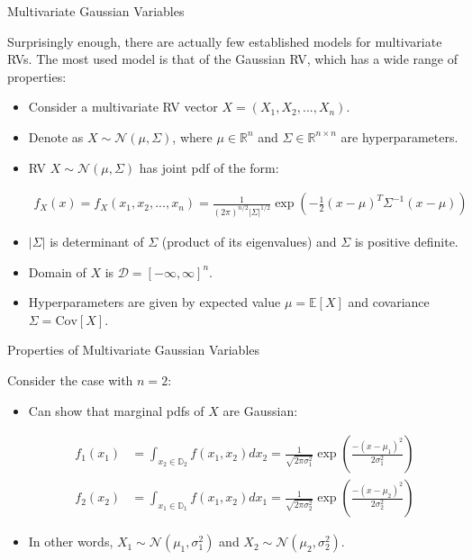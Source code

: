 \documentclass[9pt]{beamer}
\begin{document}
%
\begin{frame}{Multivariate Gaussian Variables}

Surprisingly enough, there are actually few established models for multivariate RVs.  The most used model is that of the Gaussian RV, which has a wide range of properties:

\begin{itemize}
\item Consider a multivariate RV vector $X=(X_1,X_2,...,X_n)$.

\item Denote as $X\sim \mathcal{N}(\mu,\Sigma)$, where $\mu\in \mathbb{R}^n$ and $\Sigma\in \mathbb{R}^{n\times n}$ are hyperparameters. 

\item RV $X\sim \mathcal{N}(\mu,\Sigma)$ has joint pdf of the form:
\begin{block}{}
\begin{align*}
f_X(x)=f_X(x_1,x_2,...,x_n)=\frac{1}{(2\pi)^{n/2}|\Sigma|^{1/2}}\exp\left(-\frac{1}{2}(x-\mu)^T\Sigma^{-1}(x-\mu)\right)
\end{align*}
\end{block}
\item $|\Sigma|$ is determinant of  $\Sigma$ (product of its eigenvalues) and $\Sigma$ is positive definite. 

\item Domain of $X$ is $\mathcal{D}=[-\infty,\infty]^n$. 

\item Hyperparameters are given by expected value $\mu=\mathbb{E}[X]$ and covariance $\Sigma=\textrm{Cov}[X]$.

\end{itemize}

\end{frame}

%
\begin{frame}{Properties of Multivariate Gaussian Variables}

Consider the case with $n=2$:
\begin{itemize}
\item Can show that marginal pdfs of $X$ are Gaussian:
\begin{block}{}
\begin{align*}
f_1(x_1)&=\int_{x_2\in \mathbb{D}_2}f(x_1,x_2)dx_2=\frac{1}{\sqrt{2\pi\sigma_1^2}}\exp \left({\frac{-(x-\mu_1)^2}{2\sigma_1^2}}\right)\\
f_2(x_2)&=\int_{x_1\in \mathbb{D}_1}f(x_1,x_2)dx_1=\frac{1}{\sqrt{2\pi\sigma_2^2}}\exp \left({\frac{-(x-\mu_2)^2}{2\sigma_2^2}}\right)
\end{align*} 
\end{block}
\item In other words, $X_1\sim\mathcal{N}(\mu_1,\sigma_1^2)$ and $X_2\sim\mathcal{N}(\mu_2,\sigma_2^2)$.
\end{itemize}
\end{frame}
\end{document}
